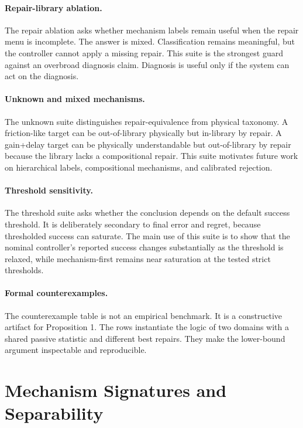 \documentclass{article}
\begin{document}
\paragraph{Repair-library ablation.}
The repair ablation asks whether mechanism labels remain useful when the repair
menu is incomplete. The answer is mixed. Classification remains meaningful, but
the controller cannot apply a missing repair. This suite is the strongest guard
against an overbroad diagnosis claim. Diagnosis is useful only if the system can
act on the diagnosis.

\paragraph{Unknown and mixed mechanisms.}
The unknown suite distinguishes repair-equivalence from physical taxonomy. A
friction-like target can be out-of-library physically but in-library by repair.
A gain+delay target can be physically understandable but out-of-library by
repair because the library lacks a compositional repair. This suite motivates
future work on hierarchical labels, compositional mechanisms, and calibrated
rejection.

\paragraph{Threshold sensitivity.}
The threshold suite asks whether the conclusion depends on the default success
threshold. It is deliberately secondary to final error and regret, because
thresholded success can saturate. The main use of this suite is to show that the
nominal controller's reported success changes substantially as the threshold is
relaxed, while mechanism-first remains near saturation at the tested strict
thresholds.

\paragraph{Formal counterexamples.}
The counterexample table is not an empirical benchmark. It is a constructive
artifact for Proposition 1. The rows instantiate the logic of two domains with a
shared passive statistic and different best repairs. They make the lower-bound
argument inspectable and reproducible.

\section{Mechanism Signatures and Separability}
\end{document}
